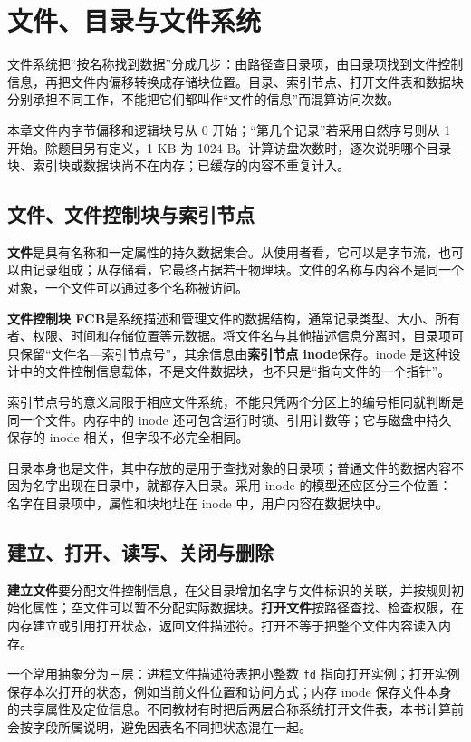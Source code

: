 \chapter{文件、目录与文件系统}\label{os-ch6}

文件系统把``按名称找到数据''分成几步：由路径查目录项，由目录项找到文件控制信息，再把文件内偏移转换成存储块位置。目录、索引节点、打开文件表和数据块分别承担不同工作，不能把它们都叫作``文件的信息''而混算访问次数。

本章文件内字节偏移和逻辑块号从 0 开始；``第几个记录''若采用自然序号则从 1 开始。除题目另有定义，1 KB 为 1024 B。计算访盘次数时，逐次说明哪个目录块、索引块或数据块尚不在内存；已缓存的内容不重复计入。

\section{文件、文件控制块与索引节点}\label{os-6-1}

\textbf{文件}是具有名称和一定属性的持久数据集合。从使用者看，它可以是字节流，也可以由记录组成；从存储看，它最终占据若干物理块。文件的名称与内容不是同一个对象，一个文件可以通过多个名称被访问。

\textbf{文件控制块 FCB}是系统描述和管理文件的数据结构，通常记录类型、大小、所有者、权限、时间和存储位置等元数据。将文件名与其他描述信息分离时，目录项可只保留``文件名---索引节点号''，其余信息由\textbf{索引节点 inode}保存。inode 是这种设计中的文件控制信息载体，不是文件数据块，也不只是``指向文件的一个指针''。

索引节点号的意义局限于相应文件系统，不能只凭两个分区上的编号相同就判断是同一个文件。内存中的 inode 还可包含运行时锁、引用计数等；它与磁盘中持久保存的 inode 相关，但字段不必完全相同。

目录本身也是文件，其中存放的是用于查找对象的目录项；普通文件的数据内容不因为名字出现在目录中，就都存入目录。采用 inode 的模型还应区分三个位置：名字在目录项中，属性和块地址在 inode 中，用户内容在数据块中。

\section{建立、打开、读写、关闭与删除}\label{os-6-2}

\textbf{建立文件}要分配文件控制信息，在父目录增加名字与文件标识的关联，并按规则初始化属性；空文件可以暂不分配实际数据块。\textbf{打开文件}按路径查找、检查权限，在内存建立或引用打开状态，返回文件描述符。打开不等于把整个文件内容读入内存。

一个常用抽象分为三层：进程文件描述符表把小整数 \allowbreak{}\texttt{fd} 指向打开实例；打开实例保存本次打开的状态，例如当前文件位置和访问方式；内存 inode 保存文件本身的共享属性及定位信息。不同教材有时把后两层合称系统打开文件表，本书计算前会按字段所属说明，避免因表名不同把状态混在一起。

